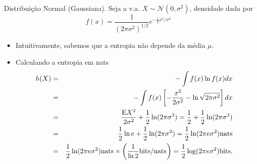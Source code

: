 \begin{frame}[allowframebreaks]
  \begin{example}
  Distribuição Normal (Gaussiana).
  Seja a v.a. $X \sim \mathcal{N}(0, \sigma^2)$, densidade dada por 
	\begin{equation}
	f(x) = \frac{1}{(2\pi \sigma^2)^{1/2}} e^{-\frac{1}{2} x^2 / \sigma^2}
	\end{equation}
  \begin{itemize}
  \item Intuitivamente, sabemos que a entropia não depende da média $\mu$.
  \end{itemize}
  \examplebreak
  \begin{itemize}
  \item Calculando a entropia em nats
	\begin{eqnarray}
	h(X) &=& - \int f(x) \ln f(x) dx \\ 
		&=& - \int f(x) \left[ - \frac{x^2}{2\sigma^2} - \ln \sqrt{2\pi \sigma^2}\right] dx \\
		&=& \frac{\mathrm{E} X^2}{2\sigma^2} + \frac{1}{2} \ln (2 \pi \sigma^2) = \frac{1}{2} + \frac{1}{2} \ln (2 \pi \sigma^2) \\
		&=& \frac{1}{2} \ln e + \frac{1}{2} \ln (2 \pi \sigma^2) = \frac{1}{2} \ln (2 \pi e \sigma^2) \text{nats} \\
		&=& \frac{1}{2} \ln (2 \pi e \sigma^2) \text{nats} \times \left( \frac{1}{\ln 2} \text{bits/nats} \right) = \frac{1}{2} \log (2 \pi e \sigma^2) \text{bits}. \nonumber
	\end{eqnarray}
  \end{itemize}
  \end{example}
\end{frame}

